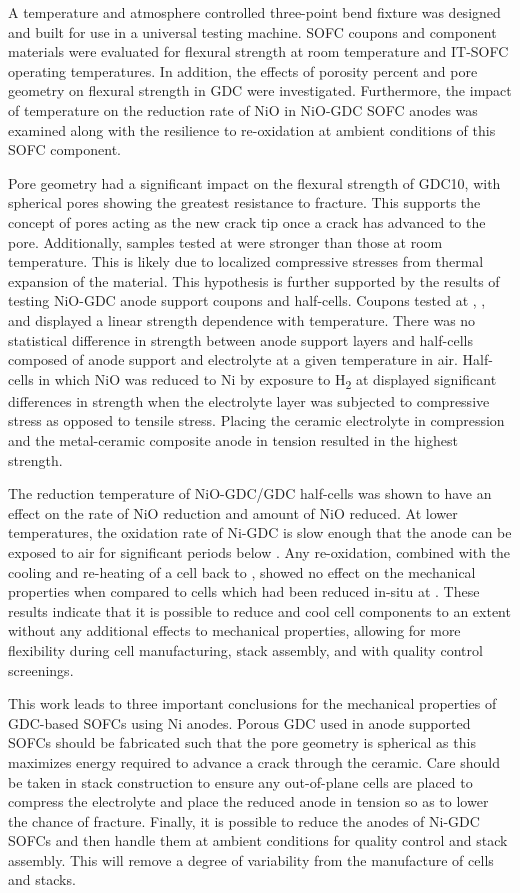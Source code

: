 A temperature and atmosphere controlled three-point bend fixture was designed and built for use in a universal testing machine.
SOFC coupons and component materials were evaluated for flexural strength at room temperature and IT-SOFC operating temperatures.
In addition, the effects of porosity percent and pore geometry on flexural strength in GDC were investigated.
Furthermore, the impact of temperature on the reduction rate of NiO in NiO-GDC SOFC anodes was examined along with the resilience to re-oxidation at ambient conditions of this SOFC component.

Pore geometry had a significant impact on the flexural strength of
GDC10, with spherical pores showing the greatest resistance to fracture.
This supports the concept of pores acting as the new crack tip once a crack has advanced to the pore.
Additionally, samples tested at  were stronger than those at room temperature.
This is likely due to localized compressive stresses from thermal expansion of the material.
This hypothesis is further supported by the results of testing NiO-GDC
anode support coupons and half-cells.
Coupons tested at , , and  displayed a linear strength dependence with temperature.
There was no statistical difference in strength between anode support layers and half-cells composed of anode support and electrolyte at a given temperature in air.
Half-cells in which NiO was reduced to Ni by exposure to H\textsubscript{2} at  displayed significant differences in strength when the electrolyte layer was subjected to compressive stress as opposed to tensile stress.
Placing the ceramic electrolyte in compression and the metal-ceramic composite anode in tension resulted in the highest strength.

The reduction temperature of NiO-GDC/GDC half-cells was shown to have an effect on the rate of NiO reduction and amount of NiO reduced.
At lower temperatures, the oxidation rate of Ni-GDC is slow enough that the anode can be exposed to air for significant periods below .
Any re-oxidation, combined with the cooling and re-heating of a cell back to
, showed no effect on the mechanical properties when compared to cells which had been reduced in-situ at .
These results indicate that it is possible to reduce and cool cell components to an extent without any additional effects to mechanical properties, allowing for more flexibility during cell manufacturing, stack assembly, and with quality control screenings.

This work leads to three important conclusions for the mechanical properties of GDC-based SOFCs using Ni anodes.
Porous GDC used in anode supported SOFCs should be fabricated such that the pore geometry is spherical as this maximizes energy required to advance a crack through the ceramic.
Care should be taken in stack construction to ensure any out-of-plane cells are placed to compress the electrolyte and place the reduced anode in tension so as to lower the chance of fracture.
Finally, it is possible to reduce the anodes of Ni-GDC SOFCs and then handle them at ambient conditions for quality control and stack assembly.
This will remove a degree of variability from the manufacture of cells and stacks.
